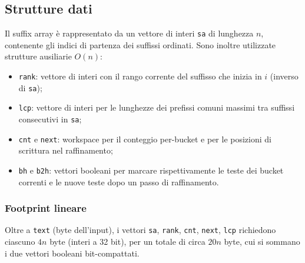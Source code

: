 		\subsection{Strutture dati}
			Il suffix array è rappresentato da un vettore di interi \texttt{sa} di lunghezza $n$, contenente gli indici di partenza dei suffissi ordinati.
			Sono inoltre utilizzate strutture ausiliarie $O(n)$:
			\begin{itemize}
				\item \texttt{rank}: vettore di interi con il rango corrente del suffisso che inizia in $i$ (inverso di \texttt{sa});
				\item \texttt{lcp}: vettore di interi per le lunghezze dei prefissi comuni massimi tra suffissi consecutivi in \texttt{sa};
				\item \texttt{cnt} e \texttt{next}: workspace per il conteggio per-bucket e per le posizioni di scrittura nel raffinamento;
				\item \texttt{bh} e \texttt{b2h}: vettori booleani per marcare rispettivamente le teste dei bucket correnti e le nuove teste dopo un passo di raffinamento.
			\end{itemize}
			
			\subsubsection*{Footprint lineare}
				Oltre a \texttt{text} (byte dell'input), i vettori \texttt{sa}, \texttt{rank}, \texttt{cnt}, \texttt{next}, \texttt{lcp} richiedono ciascuno $4n$ byte (interi a 32 bit), per un totale di circa $20n$ byte, cui si sommano i due vettori booleani bit-compattati.
		
